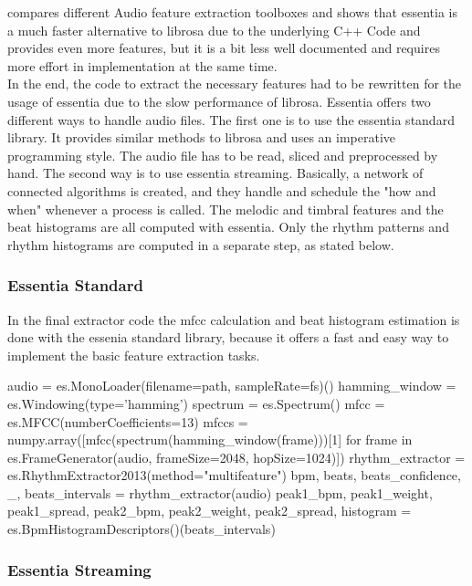 \cite{audiofeattoolb} compares different Audio feature extraction toolboxes and shows that essentia is a much faster alternative to librosa due to the underlying C++ Code and provides even more features, but it is a bit less well documented and requires more effort in implementation at the same time.\\ 
In the end, the code to extract the necessary features had to be rewritten for the usage of essentia due to the slow performance of librosa. Essentia offers two different ways to handle audio files. The first one is to use the essentia standard library. It provides similar methods to librosa and uses an imperative programming style. The audio file has to be read, sliced and preprocessed by hand. 
The second way is to use essentia streaming. Basically, a network of connected algorithms is created, and they handle and schedule the "how and when" whenever a process is called.
The melodic and timbral features and the beat histograms are all computed with essentia. Only the rhythm patterns and rhythm histograms are computed in a separate step, as stated below. 

\subsubsection{Essentia Standard}

In the final extractor code the mfcc calculation and beat histogram estimation is done with the essenia standard library, because it offers a fast and easy way to implement the basic feature extraction tasks. 
\begin{pythonCode}[frame=single,label={lst:esss},caption={essentia standard},captionpos=b]
audio = es.MonoLoader(filename=path, sampleRate=fs)()
hamming_window = es.Windowing(type='hamming')
spectrum = es.Spectrum()
mfcc = es.MFCC(numberCoefficients=13)
mfccs = numpy.array([mfcc(spectrum(hamming_window(frame)))[1] 
	for frame in es.FrameGenerator(audio, frameSize=2048, hopSize=1024)])
rhythm_extractor = es.RhythmExtractor2013(method="multifeature")
bpm, beats, beats_confidence, _, beats_intervals = rhythm_extractor(audio)
peak1_bpm, peak1_weight, peak1_spread, peak2_bpm, peak2_weight, peak2_spread, histogram =
	es.BpmHistogramDescriptors()(beats_intervals)
\end{pythonCode}

\subsubsection{Essentia Streaming}

